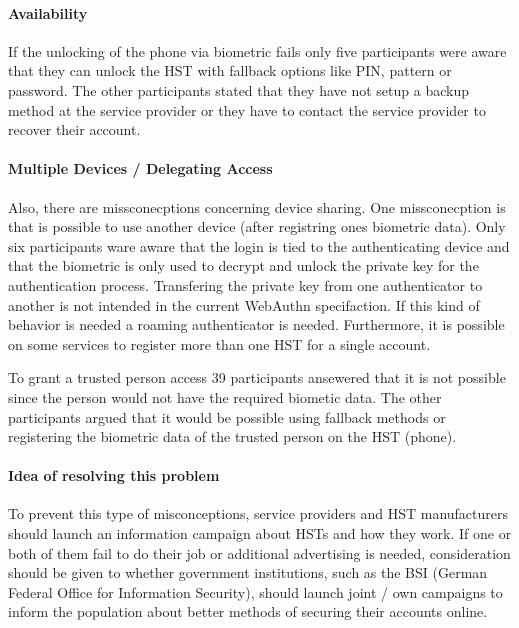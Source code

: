 \documentclass[runningheads]{llncs}
\begin{document}
\paragraph{Availability}
If the unlocking of the phone via biometric fails only five participants were aware that they can unlock the HST with fallback options like PIN, pattern or password. The other participants stated that they have not setup a backup method at the service provider or they have to contact the service provider to recover their account.

\paragraph{Multiple Devices / Delegating Access}
Also, there are missconecptions concerning device sharing. One missconecption is that is possible to use another device (after registring ones biometric data). Only six participants ware aware that the login is tied to the authenticating device and that the biometric is only used to decrypt and unlock the private key for the authentication process. Transfering the private key from one authenticator to another is not intended in the current WebAuthn specifaction. If this kind of behavior is needed a roaming authenticator is needed. Furthermore, it is possible on some services to register more than one HST for a single account.

To grant a trusted person access 39 participants ansewered that it is not possible since the person would not have the required biometic data. The other participants argued that it would be possible using fallback methods or registering the biometric data of the trusted person on the HST (phone).

\paragraph{Idea of resolving this problem}
To prevent this type of misconceptions, service providers and HST manufacturers should launch an information campaign about HSTs and how they work. 
If one or both of them fail to do their job or additional advertising is needed, consideration should be given to whether government institutions, such as the BSI (German Federal Office for Information Security), should launch joint / own campaigns to inform the population about better methods of securing their accounts online.
\end{document}
